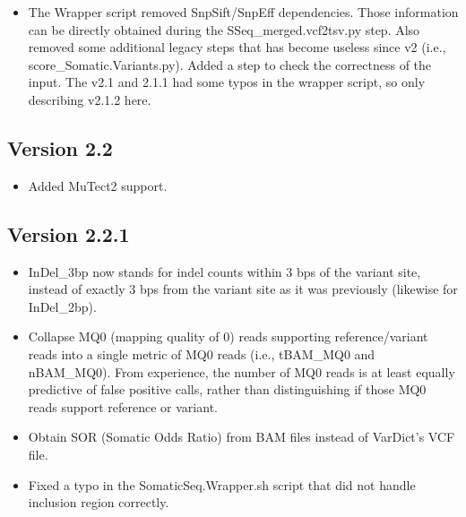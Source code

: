 \documentclass[10pt,letterpaper]{article}
\begin{document}
\begin{sloppypar}
\begin{itemize}
  \item
  The Wrapper script removed SnpSift/SnpEff dependencies. Those information can be directly obtained during the SSeq\_merged.vcf2tsv.py step. Also removed some additional legacy steps that has become useless since v2 (i.e., score\_Somatic.Variants.py). Added a step to check the correctness of the input. The v2.1 and 2.1.1 had some typos in the wrapper script, so only describing v2.1.2 here.

\end{itemize}



\subsection{Version 2.2}

\begin{itemize}

  \item
  Added MuTect2 support.

\end{itemize}



\subsection{Version 2.2.1}

\begin{itemize}

  \item
  InDel\_3bp now stands for indel counts within 3 bps of the variant site, instead of exactly 3 bps from the variant site as it was previously (likewise for InDel\_2bp). 
 
  \item
  Collapse MQ0 (mapping quality of 0) reads supporting reference/variant reads into a single metric of MQ0 reads (i.e., tBAM\_MQ0 and nBAM\_MQ0). From experience, the number of MQ0 reads is at least equally predictive of false positive calls, rather than distinguishing if those MQ0 reads support reference or variant. 
  
  \item
  Obtain SOR (Somatic Odds Ratio) from BAM files instead of VarDict's VCF file.
  
  \item
  Fixed a typo in the SomaticSeq.Wrapper.sh script that did not handle inclusion region correctly.
  
\end{itemize}




\end{sloppypar}
\end{document}
